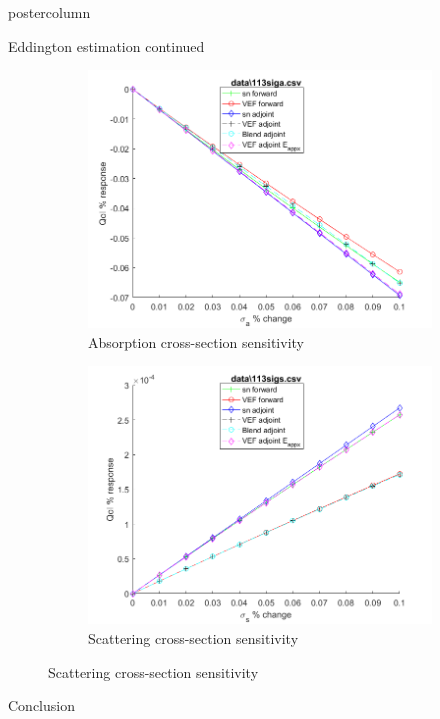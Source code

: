 \documentclass[xcolor={usenames,dvipsnames,svgnames,table}]{beamer}
\begin{document}
\begin{frame}
\begin{columns}
\begin{column}{.33\textwidth}
\begin{beamercolorbox}[center,wd=\textwidth]{postercolumn}
\begin{minipage}[T]{0.95\textwidth}
{\begin{block}{Eddington estimation continued}
\begin{figure}[H]
\begin{subfigure}{.4\textwidth}
  \centering
  \includegraphics[width=.98\linewidth]{113sigaSens.png}
  \caption{Absorption cross-section sensitivity}
  \label{fig:sfig5}
\end{subfigure}%
\begin{subfigure}{.4\textwidth}
  \centering
  \includegraphics[width=.98\linewidth]{113sigsSens.png}
  \caption{Scattering cross-section sensitivity}
  \label{fig:sfig4}
\end{subfigure}
\label{fig:fig}
\end{figure}			    
			    
			    
			    \end{block}
			    \vfill
			    \begin{block}{Conclusion}


\end{block}}
\end{minipage}
\end{beamercolorbox}
\end{column}
\end{columns}
\end{frame}
\end{document}
